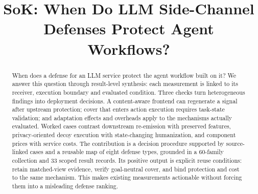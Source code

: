 \documentclass[conference,compsoc]{IEEEtran}
\title{SoK: When Do LLM Side-Channel Defenses Protect Agent Workflows?}
\author{}
\begin{document}
\maketitle

\begin{abstract}
When does a defense for an LLM service protect the agent workflow built on it? We answer this question through result-level synthesis: each measurement is linked to its receiver, execution boundary and evaluated condition. Three checks turn heterogeneous findings into deployment decisions. A content-aware frontend can regenerate a signal after upstream protection; cover that enters action execution requires task-state validation; and adaptation effects and overheads apply to the mechanisms actually evaluated. Worked cases contrast downstream re-emission with preserved features, privacy-oriented decoy execution with state-changing humanization, and component prices with service costs. The contribution is a decision procedure supported by source-linked cases and a reusable map of eight defense types, grounded in a 60-family collection and 33 scoped result records. Its positive output is explicit reuse conditions: retain matched-view evidence, verify goal-neutral cover, and bind protection and cost to the same mechanism. This makes existing measurements actionable without forcing them into a misleading defense ranking.
\end{abstract}











\clearpage
\appendices



\clearpage


\end{document}
